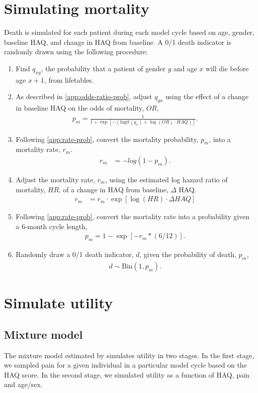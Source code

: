 \documentclass[11pt,final,fleqn]{article}\usepackage[]{graphicx}\usepackage[]{color}
\theoremstyle{plain}
\begin{document}
\begin{appendices}
\section{Simulating mortality}\label{ssec:simulating-death}
Death is simulated for each patient during each model cycle based on age, gender, baseline HAQ, and change in HAQ from baseline. A 0/1 death indicator is randomly drawn using the following procedure: 
\begin{enumerate}
\item Find $q_{xg}$, the probability that a patient of gender $g$ and age $x$ will die before age $x+1$, from lifetables.
\item As described in \autoref{app:odds-ratio-prob}, adjust $q_{gx}$ using the effect of a change in baseline HAQ on the odds of mortality, $OR$,
\begin{align}
p_m = \frac{1}{1 + \exp{\left[-(\text{logit}(q_x) + \log(OR)\cdot HAQ)\right]}}.
\end{align}
\item Following \autoref{app:rate-prob}, convert the mortality probability, $p_m$, into a mortality rate, $r_m$.
\begin{align}
r_m &= -log(1 - p_m).
\end{align}
\item Adjust the mortality rate, $r_m$, using the estimated log hazard ratio of mortality, $HR$, of a change in HAQ from baseline, $\Delta$ HAQ.
\begin{align}
r_m &= r_m \cdot \exp[\log(HR) \cdot \Delta HAQ]
\end{align}
\item Following \autoref{app:rate-prob}, convert the mortality rate into a probability given a 6-month cycle length,
\begin{align}
p_m = 1 - \exp[-r_m * (6/12)].
\end{align}
\item Randomly draw a 0/1 death indicator, $d$, given the probability of death, $p_m$,
\begin{align}
d \sim \text{Bin}(1, p_m).
\end{align}
\end{enumerate}

\section{Simulate utility}\label{app:utility}
\subsection{Mixture model}\label{app:sim-utility-mixture}
The mixture model estimated by \citet{alava2013relationship} simulates utility in two stages. In the first stage, we sampled pain for a given individual in a particular model cycle based on the HAQ score. In the second stage, we simulated utility as a function of HAQ, pain and age/sex.


\end{appendices}
\end{document}

